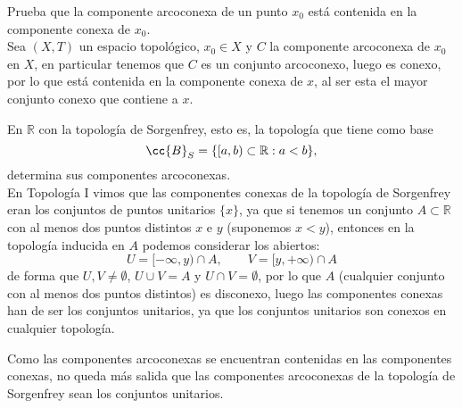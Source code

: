 \begin{ejercicio}
    Prueba que la componente arcoconexa de un punto $x_0$ está contenida en la componente conexa de $x_0$.\\

    \noindent
    Sea $(X,T)$ un espacio topológico, $x_0\in X$ y $C$ la componente arcoconexa de $x_0$ en $X$, en particular tenemos que $C$ es un conjunto arcoconexo, luego es conexo, por lo que está contenida en la componente conexa de $x$, al ser esta el mayor conjunto conexo que contiene a $x$.
\end{ejercicio}

\begin{ejercicio}
    En $\mathbb{R}$ con la topología de Sorgenfrey, esto es, la topología que tiene como base
    \begin{equation*}
        \cc{B}_S = \{[a,b) \subset \mathbb{R} : a<b\},
    \end{equation*}
    determina sus componentes arcoconexas.\\

    \noindent
    En Topología I vimos que las componentes conexas de la topología de Sorgenfrey eran los conjuntos de puntos unitarios $\{x\}$, ya que si tenemos un conjunto $A\subset \mathbb{R}$ con al menos dos puntos distintos $x$ e $y$ (suponemos $x<y$), entonces en la topología inducida en $A$ podemos considerar los abiertos:
    \begin{equation*}
        U = [-\infty,y)\cap A, \qquad V = [y,+\infty)\cap A
    \end{equation*}
    de forma que $U,V\neq \emptyset $, $U\cup V = A$ y $U\cap V = \emptyset $, por lo que $A$ (cualquier conjunto con al menos dos puntos distintos) es disconexo, luego las componentes conexas han de ser los conjuntos unitarios, ya que los conjuntos unitarios son conexos en cualquier topología.

    Como las componentes arcoconexas se encuentran contenidas en las componentes conexas, no queda más salida que las componentes arcoconexas de la topología de Sorgenfrey sean los conjuntos unitarios.
\end{ejercicio}

